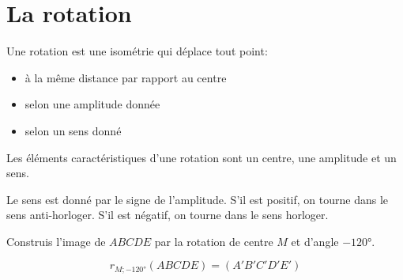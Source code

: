 \documentclass[../../syllabus_2.tex]{subfiles}
\begin{document}
\newpage
\section{La rotation} 
Une rotation est une isométrie qui déplace tout point:
\begin{itemize}[label=]
    \item à la même distance par rapport au centre
    \item selon une amplitude donnée
    \item selon un sens donné
\end{itemize}

Les éléments caractéristiques d'une rotation sont
un centre, une amplitude et un sens.

Le sens est donné par le signe de l'amplitude. S'il est positif, on tourne dans
le sens anti-horloger. S'il est négatif, on tourne dans le sens horloger.
\begin{center}
    \hfil
\end{center}

Construis l'image de $ABCDE$ par la rotation de centre $M$ et d'angle $\ang{-120}$.

\vfil
\begin{center}
    
\end{center}
\[r_{M;\ang{-120}}(ABCDE) = (A'B'C'D'E')\]
\end{document}

